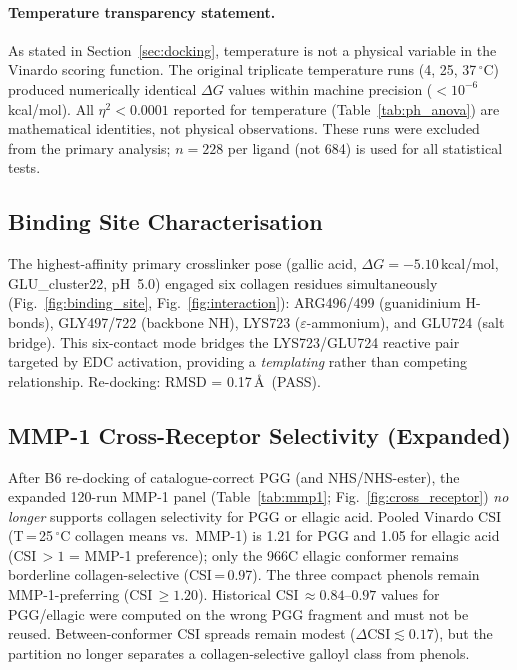 \documentclass[11pt]{article}
\begin{document}
\paragraph{Temperature transparency statement.}
As stated in Section~\ref{sec:docking}, temperature is not a physical
variable in the Vinardo scoring function.  The original triplicate
temperature runs (4, 25, 37\,$^{\circ}$C) produced numerically identical
$\Delta G$ values within machine precision ($< 10^{-6}$\,kcal/mol).
All $\eta^{2} < 0.0001$ reported for temperature (Table~\ref{tab:ph_anova})
are mathematical identities, not physical observations.  These runs were
excluded from the primary analysis; $n = 228$ per ligand (not 684) is used
for all statistical tests.

\subsection{Binding Site Characterisation}
\label{sec:binding_site}

The highest-affinity primary crosslinker pose (gallic acid,
$\Delta G = -5.10$\,kcal/mol, GLU\_cluster22, pH~5.0) engaged six collagen
residues simultaneously (Fig.~\ref{fig:binding_site},
Fig.~\ref{fig:interaction}): ARG496/499 (guanidinium H-bonds), GLY497/722
(backbone NH), LYS723 ($\varepsilon$-ammonium), and GLU724 (salt bridge).
This six-contact mode bridges the LYS723/GLU724 reactive pair targeted by
EDC activation, providing a \emph{templating} rather than competing
relationship.  Re-docking: RMSD = 0.17\,\AA\ (PASS).

\subsection{MMP-1 Cross-Receptor Selectivity (Expanded)}
\label{sec:mmp1}

After B6 re-docking of catalogue-correct PGG (and NHS/NHS-ester), the
expanded 120-run MMP-1 panel (Table~\ref{tab:mmp1};
Fig.~\ref{fig:cross_receptor}) \emph{no longer} supports collagen
selectivity for PGG or ellagic acid.
Pooled Vinardo CSI (T\,=\,25\,$^{\circ}$C collagen means vs.\ MMP-1) is
1.21 for PGG and 1.05 for ellagic acid (CSI\,$> 1$ = MMP-1 preference);
only the 966C ellagic conformer remains borderline collagen-selective
(CSI\,=\,0.97).
The three compact phenols remain MMP-1-preferring (CSI\,$\geq 1.20$).
Historical CSI\,$\approx 0.84$--$0.97$ values for PGG/ellagic were
computed on the wrong PGG fragment and must not be reused.
Between-conformer CSI spreads remain modest
($\Delta\mathrm{CSI} \lesssim 0.17$), but the partition no longer
separates a collagen-selective galloyl class from phenols.
\end{document}
